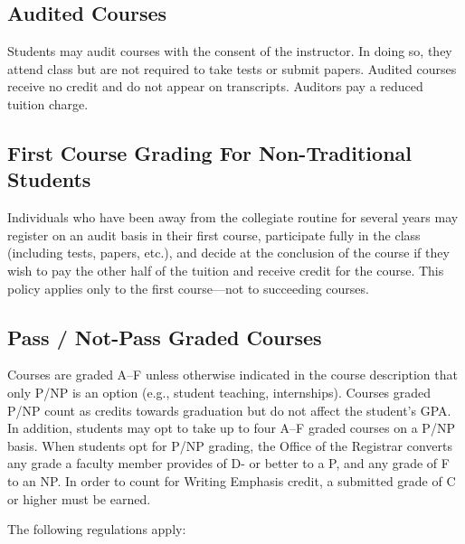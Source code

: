 \documentclass[
  letterpaper,
]{scrbook}
\begin{document}
\subsection{Audited Courses}\label{audited-courses}

Students may audit courses with the consent of the instructor. In doing
so, they attend class but are not required to take tests or submit
papers. Audited courses receive no credit and do not appear on
transcripts. Auditors pay a reduced tuition charge.

\subsection{First Course Grading For Non-Traditional
Students}\label{first-course-grading-for-non-traditional-students}

Individuals who have been away from the collegiate routine for several
years may register on an audit basis in their first course, participate
fully in the class (including tests, papers, etc.), and decide at the
conclusion of the course if they wish to pay the other half of the
tuition and receive credit for the course. This policy applies only to
the first course---not to succeeding courses.

\subsection{Pass / Not-Pass Graded
Courses}\label{pass-not-pass-graded-courses}

Courses are graded A--F unless otherwise indicated in the course
description that only P/NP is an option (e.g., student teaching,
internships). Courses graded P/NP count as credits towards graduation
but do not affect the student's GPA. In addition, students may opt to
take up to four A--F graded courses on a P/NP basis. When students opt
for P/NP grading, the Office of the Registrar converts any grade a
faculty member provides of D- or better to a P, and any grade of F to an
NP. In order to count for Writing Emphasis credit, a submitted grade of
C or higher must be earned.

The following regulations apply:
\end{document}
